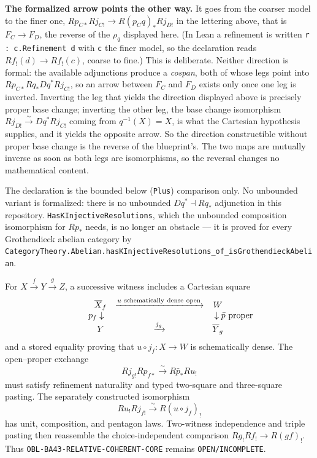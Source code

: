 {\smallskip
\noindent\textbf{The formalized arrow points the other way.}  It goes from the coarser model to
the finer one, $Rp_{C*}Rj_{C!}\to R(p_Cq)_*Rj_{D!}$ in the lettering above, that is
$F_C\to F_D$, the reverse of the $\rho_q$ displayed here.  (In Lean a refinement is written
\texttt{r : c.Refinement d} with \texttt{c} the finer model, so the declaration reads
$Rf_!(d)\to Rf_!(c)$, coarse to fine.)  This is deliberate.  Neither direction is formal: the
available adjunctions produce a \emph{cospan}, both of whose legs point into
$Rp_{C*}Rq_*Dq^*Rj_{C!}$, so an arrow between $F_C$ and $F_D$ exists only once one leg is
inverted.  Inverting the leg that yields the direction displayed above is precisely proper base
change; inverting the other leg, the base change isomorphism
$Rj_{D!}\xrightarrow{\sim}Dq^*Rj_{C!}$ coming from $q^{-1}(X)=X$, is what the Cartesian
hypothesis supplies, and it yields the opposite arrow.  So the direction constructible without
proper base change is the reverse of the blueprint's.  The two maps are mutually inverse as soon
as both legs are isomorphisms, so the reversal changes no mathematical content.

\smallskip
\noindent The declaration is the bounded below (\texttt{Plus}) comparison only.  No unbounded
variant is formalized: there is no unbounded $Dq^*\dashv Rq_*$ adjunction in this repository.
\texttt{HasKInjectiveResolutions}, which the unbounded composition isomorphism for $Rp_*$ needs,
is no longer an obstacle --- it is proved for every Grothendieck abelian category by
\texttt{CategoryTheory.Abelian.hasKInjectiveResolutions\_of\_isGrothendieckAbelian}.}

For $X\xrightarrow fY\xrightarrow gZ$, a successive witness includes a
Cartesian square
\[
\begin{array}{ccc}
\overline X_f&\xrightarrow{u\ \mathrm{schematically\ dense\ open}}&W\\
\mathllap{p_f}\downarrow&&\downarrow\mathrlap{\bar p\ \mathrm{proper}}\\
Y&\xrightarrow{j_g}&\overline Y_g
\end{array}
\]
and a stored equality proving that $u\circ j_f:X\to W$ is schematically
dense.  The open--proper exchange
\[
 Rj_{g!}Rp_{f*}\xrightarrow{\sim}R\bar p_*Ru_!
\tag{BA43-OPX}
\]
must satisfy refinement naturality and typed two-square and three-square
pasting.  The separately constructed isomorphism
\[
 Ru_!Rj_{f!}\xrightarrow{\sim}R(u\circ j_f)_!
\]
has unit, composition, and pentagon laws.  Two-witness independence and triple
pasting then reassemble the choice-independent comparison
$Rg_!Rf_!\to R(gf)_!$.  Thus
\texttt{OBL-BA43-RELATIVE-COHERENT-CORE} remains
\texttt{OPEN/INCOMPLETE}.

